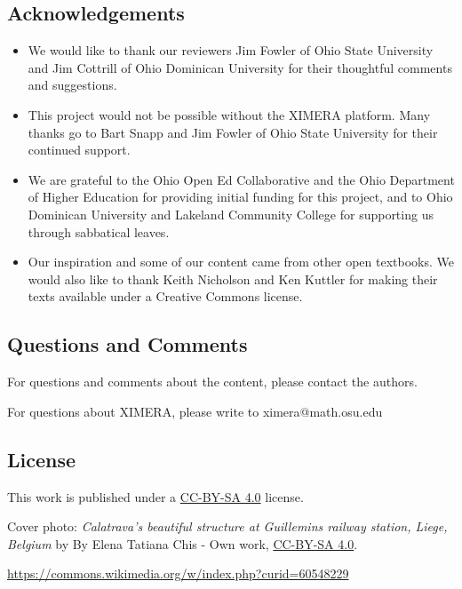 \documentclass{ximera}
\begin{document}

\subsection{Acknowledgements}
\begin{itemize}
\item
We would like to thank our reviewers Jim Fowler of Ohio State University and Jim Cottrill of Ohio Dominican University for their thoughtful comments and suggestions.  
\item This project would not be possible without the XIMERA platform.  Many thanks go to Bart Snapp and Jim Fowler of Ohio State University for their continued support.   
\item We are grateful to the Ohio Open Ed Collaborative and the Ohio Department of Higher Education for providing initial funding for this project, and to Ohio Dominican University and Lakeland Community College for supporting us through sabbatical leaves.
\item Our inspiration and some of our content came from other open textbooks. We would also like to thank Keith Nicholson and Ken Kuttler for making their texts available under a Creative Commons license.
\end{itemize}

\subsection{Questions and Comments}
For questions and comments about the content, please contact the authors.

For questions about XIMERA, please write to ximera@math.osu.edu

\subsection{License}
This work is published under a \href{https://creativecommons.org/licenses/by-sa/4.0/deed.en}{CC-BY-SA 4.0} license.

Cover photo:  {\it Calatrava's beautiful structure at Guillemins railway station, Liege, Belgium} by By Elena Tatiana Chis - Own work, \href{https://creativecommons.org/licenses/by-sa/4.0/deed.en}{CC-BY-SA 4.0}.  

\href{https://commons.wikimedia.org/w/index.php?curid=60548229}{https://commons.wikimedia.org/w/index.php?curid=60548229}
\end{document}
